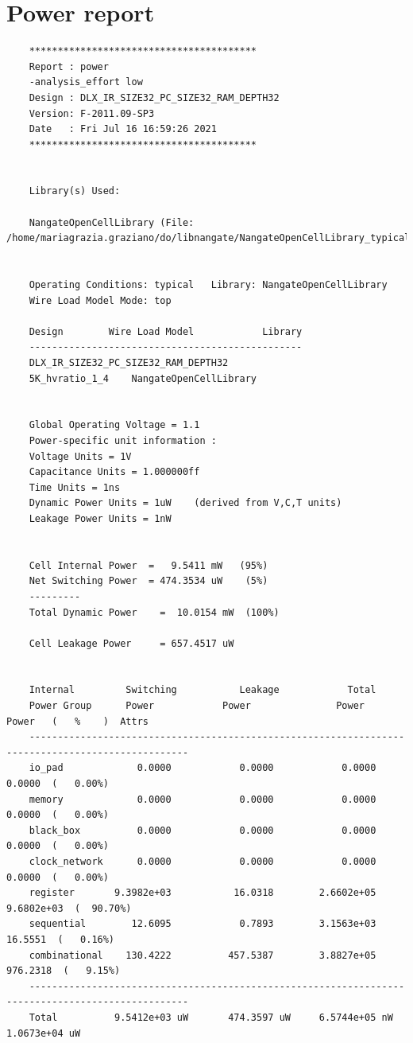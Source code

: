 \section{Power report}
\begin{lstlisting}
	****************************************
	Report : power
	-analysis_effort low
	Design : DLX_IR_SIZE32_PC_SIZE32_RAM_DEPTH32
	Version: F-2011.09-SP3
	Date   : Fri Jul 16 16:59:26 2021
	****************************************
	
	
	Library(s) Used:
	
	NangateOpenCellLibrary (File: /home/mariagrazia.graziano/do/libnangate/NangateOpenCellLibrary_typical_ecsm.db)
	
	
	Operating Conditions: typical   Library: NangateOpenCellLibrary
	Wire Load Model Mode: top
	
	Design        Wire Load Model            Library
	------------------------------------------------
	DLX_IR_SIZE32_PC_SIZE32_RAM_DEPTH32
	5K_hvratio_1_4    NangateOpenCellLibrary
	
	
	Global Operating Voltage = 1.1  
	Power-specific unit information :
	Voltage Units = 1V
	Capacitance Units = 1.000000ff
	Time Units = 1ns
	Dynamic Power Units = 1uW    (derived from V,C,T units)
	Leakage Power Units = 1nW
	
	
	Cell Internal Power  =   9.5411 mW   (95%)
	Net Switching Power  = 474.3534 uW    (5%)
	---------
	Total Dynamic Power    =  10.0154 mW  (100%)
	
	Cell Leakage Power     = 657.4517 uW
	
	
	Internal         Switching           Leakage            Total
	Power Group      Power            Power               Power              Power   (   %    )  Attrs
	--------------------------------------------------------------------------------------------------
	io_pad             0.0000            0.0000            0.0000            0.0000  (   0.00%)
	memory             0.0000            0.0000            0.0000            0.0000  (   0.00%)
	black_box          0.0000            0.0000            0.0000            0.0000  (   0.00%)
	clock_network      0.0000            0.0000            0.0000            0.0000  (   0.00%)
	register       9.3982e+03           16.0318        2.6602e+05        9.6802e+03  (  90.70%)
	sequential        12.6095            0.7893        3.1563e+03           16.5551  (   0.16%)
	combinational    130.4222          457.5387        3.8827e+05          976.2318  (   9.15%)
	--------------------------------------------------------------------------------------------------
	Total          9.5412e+03 uW       474.3597 uW     6.5744e+05 nW     1.0673e+04 uW
\end{lstlisting}


